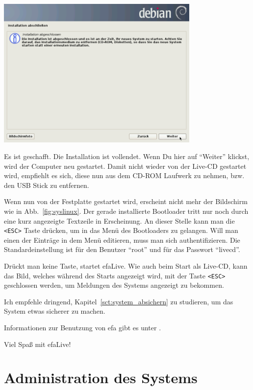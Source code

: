 \documentclass[a4paper,12pt,twoside]{article}
\begin{document}
\begin{minipage}{\linewidth}
    \centering
    \includegraphics[width=10cm]{efaLivede-img/efaLivede-img18.png}
    \label{fig:abschluss}
\end{minipage}
\bigskip

Es ist geschafft. Die Installation ist vollendet. Wenn Du hier auf
"`Weiter"' klickst, wird der Computer neu
gestartet. Damit nicht wieder von der Live-CD gestartet wird, empfiehlt
es sich, diese nun aus dem CD-ROM Laufwerk zu nehmen, bzw. den USB
Stick zu entfernen.

Wenn nun von der Festplatte gestartet wird, erscheint nicht mehr der
Bildschirm wie in Abb.~\ref{fig:syslinux}. Der gerade installierte
Bootloader tritt nur noch durch eine kurz angezeigte Textzeile in
Erscheinung. An dieser Stelle kann man die \texttt{{\textless}ESC{\textgreater}}
Taste drücken, um in das Menü des Bootloaders zu gelangen. Will man
einen der Einträge in dem Menü editieren, muss man sich
authentifizieren. Die Standardeinstellung ist für den Benutzer
"`root"' und für das Passwort "`livecd"'. 

Drückt man keine Taste, startet efaLive. Wie auch beim Start als
Live-CD, kann das Bild, welches während des Starts angezeigt wird, mit
der Taste \texttt{{\textless}ESC{\textgreater}} geschlossen werden, um Meldungen
des Systems angezeigt zu bekommen.

Ich empfehle dringend, Kapitel~\ref{sct:system_absichern} zu studieren, um das System etwas
sicherer zu machen.

\bigskip
Informationen zur Benutzung von efa gibt es unter \cite{EFA2}.

\bigskip
Viel Spaß mit efaLive!


\section{Administration des Systems}
\label{sct:administration}
\end{document}
